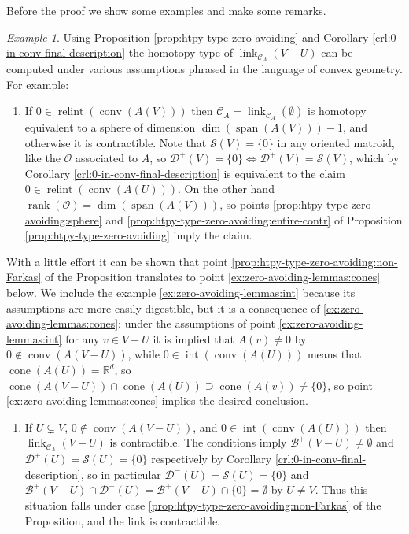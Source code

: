 \documentclass[a4paper,11pt,reqno, english]{amsart}
\theoremstyle{definition}
\theoremstyle{remark}
\newtheorem{example}[theorem]{Example}
\newcommand\R{\mathbb R}
\DeclareMathOperator{\link}{\mathrm{link}}
\DeclareMathOperator{\cone}{\mathrm{cone}}
\DeclareMathOperator{\interior}{\mathrm{int}}
\DeclareMathOperator{\relint}{\mathrm{relint}}
\DeclareMathOperator{\conv}{\mathrm{conv}}
\begin{document}
Before the proof we show some examples and make some remarks.
\begin{example}\label{ex:zero-avoiding-lemmas}
    Using Proposition \ref{prop:htpy-type-zero-avoiding} and Corollary \ref{crl:0-in-conv-final-description} the homotopy type of $\link_{\mathscr{C}_A}(V-U)$ can be computed under various assumptions phrased in the language of convex geometry. For example:
    \begin{enumerate}[label=\normalfont{(\arabic*)}]
        \item\label{ex:zero-avoiding-lemmas:full} If $0\in\relint(\conv(A(V)))$ then $\mathscr{C}_A=\link_{\mathscr{C}_A}(\emptyset)$ is homotopy equivalent to a sphere of dimension $\dim(\operatorname{span}(A(V)))-1$, and otherwise it is contractible. Note that $\mathscr{S}(V)=\{0\}$ in any oriented matroid, like the $\mathscr{O}$ associated to $A$, so $\mathscr{D}^+(V)=\{0\}\iff\mathscr{D}^+(V)=\mathscr{S}(V)$, which by Corollary \ref{crl:0-in-conv-final-description} is equivalent to the claim $0\in\relint(\conv(A(U)))$. On the other hand $\operatorname{rank}(\mathscr{O})=\dim(\operatorname{span}(A(V)))$, so points \ref{prop:htpy-type-zero-avoiding:sphere} and \ref{prop:htpy-type-zero-avoiding:entire-contr} of Proposition \ref{prop:htpy-type-zero-avoiding} imply the claim.
    \end{enumerate} 
    With a little effort it can be shown that point \ref{prop:htpy-type-zero-avoiding:non-Farkas} of the Proposition translates to point \ref{ex:zero-avoiding-lemmas:cones} below. We include the example \ref{ex:zero-avoiding-lemmas:int} because its assumptions are more easily digestible, but it is a consequence of \ref{ex:zero-avoiding-lemmas:cones}: under the assumptions of point \ref{ex:zero-avoiding-lemmas:int} for any $v\in V-U$ it is implied that $A(v)\neq 0$ by $0\notin\conv(A(V-U))$, while $0\in\interior(\conv(A(U)))$ means that $\cone(A(U))=\R^d$, so $\cone(A(V-U))\cap\cone(A(U))\supseteq\cone(A(v))\neq\{0\}$, so point \ref{ex:zero-avoiding-lemmas:cones} implies the desired conclusion.
    \begin{enumerate}[resume,label=\normalfont{(\arabic*)}]
        \item\label{ex:zero-avoiding-lemmas:int} If $U\subsetneq V$, $0\notin\conv(A(V-U))$, and $0\in\interior(\conv(A(U)))$ then $\link_{\mathscr{C}_A}(V-U)$ is contractible. The conditions imply $\mathscr{B}^+(V-U)\neq\emptyset$ and $\mathscr{D}^+(U)=\mathscr{S}(U)=\{0\}$ respectively by Corollary \ref{crl:0-in-conv-final-description}, so in particular $\mathscr{D}^-(U)=\mathscr{S}(U)=\{0\}$ and $\mathscr{B}^+(V-U)\cap\mathscr{D}^-(U)=\mathscr{B}^+(V-U)\cap\{0\}=\emptyset$ by $U\neq V$. Thus this situation falls under case \ref{prop:htpy-type-zero-avoiding:non-Farkas} of the Proposition, and the link is contractible.

\end{enumerate}
\end{example}
\end{document}
